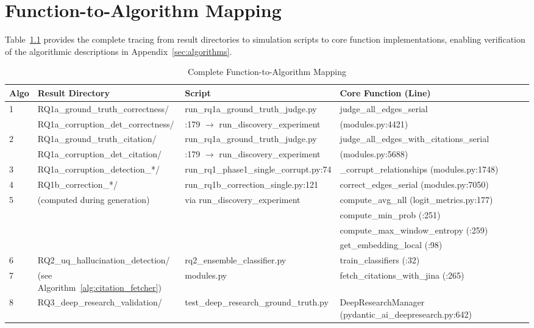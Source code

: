 
\chapter{Function-to-Algorithm Mapping}
\label{sec:function_mapping}

Table~\ref{tab:function_mapping} provides the complete tracing from result directories to simulation scripts to core function implementations, enabling verification of the algorithmic descriptions in Appendix~\ref{sec:algorithms}.

\begin{table}[H]
\centering
\caption{Complete Function-to-Algorithm Mapping}
\label{tab:function_mapping}
\footnotesize
\begin{tabularx}{\textwidth}{@{}l l l X@{}}
\toprule
\textbf{Algo} & \textbf{Result Directory} & \textbf{Script} & \textbf{Core Function (Line)} \\
\midrule
\multirow{2}{*}{1} & RQ1a\_ground\_truth\_correctness/ & run\_rq1a\_ground\_truth\_judge.py & judge\_all\_edges\_serial \\
 & RQ1a\_corruption\_det\_correctness/ & :179 $\rightarrow$ run\_discovery\_experiment & (modules.py:4421) \\
\midrule
\multirow{2}{*}{2} & RQ1a\_ground\_truth\_citation/ & run\_rq1a\_ground\_truth\_judge.py & judge\_all\_edges\_with\_citations\_serial \\
 & RQ1a\_corruption\_det\_citation/ & :179 $\rightarrow$ run\_discovery\_experiment & (modules.py:5688) \\
\midrule
3 & RQ1a\_corruption\_detection\_*/ & run\_rq1\_phase1\_single\_corrupt.py:74 & \_corrupt\_relationships (modules.py:1748) \\
\midrule
4 & RQ1b\_correction\_*/ & run\_rq1b\_correction\_single.py:121 & correct\_edges\_serial (modules.py:7050) \\
\midrule
\multirow{4}{*}{5} & \multirow{4}{*}{(computed during generation)} & \multirow{4}{*}{via run\_discovery\_experiment} & compute\_avg\_nll (logit\_metrics.py:177) \\
 & & & compute\_min\_prob (:251) \\
 & & & compute\_max\_window\_entropy (:259) \\
 & & & get\_embedding\_local (:98) \\
\midrule
6 & RQ2\_uq\_hallucination\_detection/ & rq2\_ensemble\_classifier.py & train\_classifiers (:32) \\
7 & (see Algorithm~\ref{alg:citation_fetcher}) & modules.py & fetch\_citations\_with\_jina (:265) \\
8 & RQ3\_deep\_research\_validation/ & test\_deep\_research\_ground\_truth.py & DeepResearchManager (pydantic\_ai\_deepresearch.py:642) \\
\bottomrule
\end{tabularx}
\end{table}

